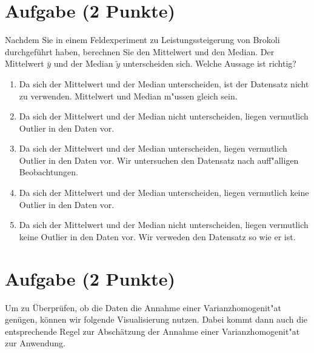 \documentclass[a4paper, 9pt]{scrartcl}\usepackage[]{graphicx}\usepackage[]{xcolor}
\begin{document}
\section{Aufgabe \hfill (2 Punkte)}



Nachdem Sie in einem Feldexperiment zu Leistungssteigerung von
Brokoli durchgef{\"u}hrt haben, berechnen Sie den Mittelwert und den
Median. Der Mittelwert $\bar{y}$ und der Median $\tilde{y}$
unterscheiden sich. Welche Aussage ist richtig?




\begin{enumerate}
\item [\textbf{A} \msquare] Da sich der Mittelwert und der Median unterscheiden, ist der Datensatz nicht zu verwenden. Mittelwert und Median m{"u}ssen gleich sein.
\item [\textbf{B} \msquare] Da sich der Mittelwert und der Median nicht unterscheiden, liegen vermutlich Outlier in den Daten vor.
\item [\textbf{C} \msquare] Da sich der Mittelwert und der Median unterscheiden, liegen vermutlich Outlier in den Daten vor. Wir untersuchen den Datensatz nach auff{"a}lligen Beobachtungen.
\item [\textbf{D} \msquare] Da sich der Mittelwert und der Median unterscheiden, liegen vermutlich keine Outlier in den Daten vor.
\item [\textbf{E} \msquare] Da sich der Mittelwert und der Median nicht unterscheiden, liegen vermutlich keine Outlier in den Daten vor. Wir verweden den Datensatz so wie er ist.
\end{enumerate}

\section{Aufgabe \hfill (2 Punkte)}



Um zu {\"U}berpr{\"u}fen, ob die Daten die Annahme einer Varianzhomogenit{"a}t gen{\"u}gen, k{\"o}nnen
wir folgende Visualisierung nutzen. Dabei kommt dann auch die entsprechende
Regel zur Absch{\"a}tzung der Annahme einer Varianzhomogenit{"a}t zur Anwendung. 
\end{document}

